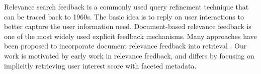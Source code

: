 Relevance search feedback is a commonly used query refinement technique that can be traced back to 1960s. The basic idea is to reply on user interactions to better capture the user information need. Document-based relevance feedback is one of the most widely used explicit feedback mechanisms. Many approaches have been proposed to incorporate document relevance feedback into retrieval \cite{Zhai2001, Zhang2004}. Our work is motivated by early work in relevance feedback, and differs by focusing on implicitly retrieving user interest score with faceted metadata.


